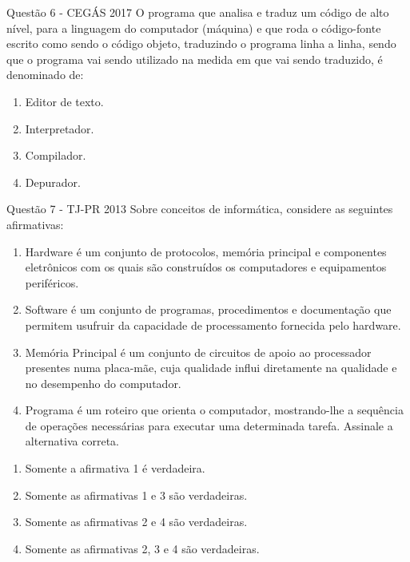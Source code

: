 \documentclass[aspectratio=169,
				xcolor=table]{beamer}
\begin{document}
	\begin{frame}{Questão 6 - CEGÁS 2017}
		O programa que analisa e traduz um código de alto nível, para a linguagem do computador (máquina) e que roda o código-fonte escrito como sendo o código objeto, traduzindo o programa linha a linha, sendo que o programa vai sendo utilizado na medida em que vai sendo traduzido, é denominado de:  
		\begin{enumerate}[A]
			\item Editor de texto.
			\item Interpretador. 
			\item Compilador.  
			\item Depurador.
		\end{enumerate}
	\end{frame}
	
	\begin{frame}[allowframebreaks]{Questão 7 -  TJ-PR 2013}
		Sobre conceitos de informática, considere as seguintes afirmativas:  
		\begin{enumerate}
			\item Hardware é um conjunto de protocolos, memória principal e componentes eletrônicos com os quais são construídos os computadores e equipamentos periféricos. 
			\item Software é um conjunto de programas, procedimentos e documentação que permitem usufruir da capacidade de processamento fornecida pelo hardware. 
			\item Memória Principal é um conjunto de circuitos de apoio ao processador presentes numa placa-mãe, cuja qualidade influi diretamente na qualidade e no desempenho do computador. 
			\item Programa é um roteiro que orienta o computador, mostrando-lhe a sequência de operações necessárias para executar uma determinada tarefa.  
Assinale a alternativa correta.
		\end{enumerate}
		\framebreak
		\begin{enumerate}[A]
			\item Somente a afirmativa 1 é verdadeira.
			\item Somente as afirmativas 1 e 3 são verdadeiras. 
			\item Somente as afirmativas 2 e 4 são verdadeiras.
			\item Somente as afirmativas 2, 3 e 4 são verdadeiras.
		\end{enumerate}
	\end{frame}
	
\end{document}
